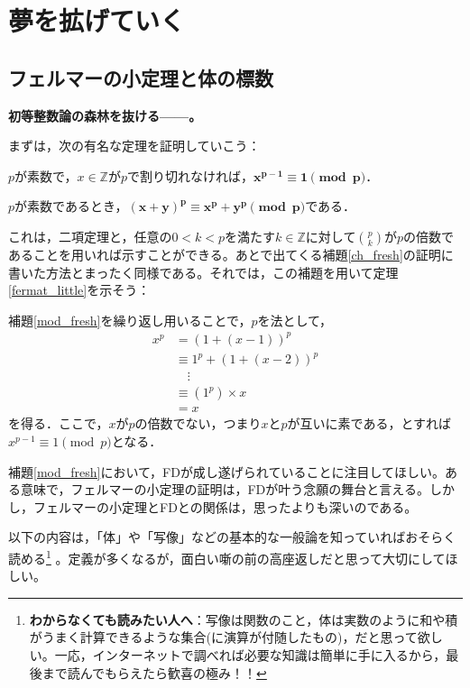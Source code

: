 \section{夢を拡げていく}\label{dreaming}
\subsection{フェルマーの小定理と体の標数}
\textbf{初等整数論の森林を抜ける------。}

\vspace{10pt}

まずは，次の有名な定理を証明していこう：

\begin{thm}[フェルマーの小定理]\label{fermat_little}
    $p$が素数で，$x \in \mathbb{Z}$が$p$で割り切れなければ，$\boldsymbol{x^{p-1} \equiv 1 \pmod{p}}$．
\end{thm}

\begin{lemma}[\textsf{FD}]\label{mod_fresh}
    $p$が素数であるとき，$\boldsymbol{(x + y)^p \equiv x^p + y^p \pmod{p}}$である．
\end{lemma}
これは，二項定理と，任意の$0 < k < pを満たすk \in \mathbb{Z}$に対して$\binom{p}{k}$が$p$の倍数であることを用いれば示すことができる。あとで出てくる補題\ref{ch_fresh}の証明に書いた方法とまったく同様である。それでは，この補題を用いて定理\ref{fermat_little}を示そう：
\begin{prf}
    補題\ref{mod_fresh}を繰り返し用いることで，$p$を法として，
    \begin{align*}
    x^{p} & = (1 + (x - 1))^p  \\
    & \equiv 1^p + (1 + (x - 2))^p \\
    & \quad \vdots \\
    & \equiv (1^p) \times x \\
    & = x
\end{align*}
を得る．ここで，$x$が$p$の倍数でない，つまり$x$と$p$が互いに素である，とすれば$x^{p-1} \equiv 1 \pmod{p}$となる．
\end{prf}

補題\ref{mod_fresh}において，\textsf{FD}が成し遂げられていることに注目してほしい。ある意味で，フェルマーの小定理の証明は，\textsf{FD}が叶う念願の舞台と言える。しかし，フェルマーの小定理と\textsf{FD}との関係は，思ったよりも深いのである。

以下の内容は，「体」や「写像」などの基本的な一般論を知っていればおそらく読める\footnote{
\textbf{わからなくても読みたい人へ}：写像は関数のこと，体は実数のように和や積がうまく計算できるような集合(に演算が付随したもの)，だと思って欲しい。一応，インターネットで調べれば必要な知識は簡単に手に入るから，最後まで読んでもらえたら歓喜の極み！！
} 。定義が多くなるが，面白い噺の前の高座返しだと思って大切にしてほしい。


